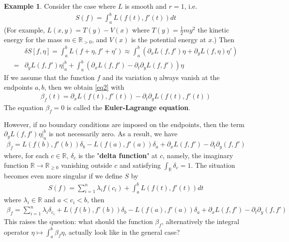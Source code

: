 \documentclass[12pt,b5paper,notitlepage]{article}
\theoremstyle{definition}
\newtheorem{eg}[df]{Example}
\theoremstyle{plain}
\newcommand{\Rbb}{\mathbb R}
\newcommand{\dps}{\displaystyle}
\numberwithin{equation}{section}
\begin{document}
\begin{eg}
Consider the case where $L$ is smooth and $r=1$, i.e.
\begin{align*}
S(f)=\int_a^b L(f(t),f'(t))dt
\end{align*}
(For example, $L(x,y)=T(y)-V(x)$ where $T(y)=\frac 12 my^2$ the kinetic energy for the mass $m\in\Rbb_{>0}$, and $V(x)$ is the potential energy at $x$.) Then
\begin{align*}
&\delta S[f,\eta]=\int_a^b L(f+\eta,f'+\eta')\approx \int_a^b (\partial_x L(f,f')\eta+\partial_y L(f,\eta)\eta')\\
=&\partial_yL(f,f')\eta\big|_a^b+\int_a^b (\partial_xL(f,f')-\partial_t\partial_yL(f,f'))\eta
\end{align*}
If we assume that the function $f$ and its variation $\eta$ always vanish at the endpoints $a,b$, then we obtain \eqref{eq2} with
\begin{align*}
\beta_f(t)=\partial_xL(f(t),f'(t))-\partial_t\partial_yL(f(t),f'(t))
\end{align*}
The equation $\beta_f=0$ is called the \textbf{Euler-Lagrange equation}. 

However, if no boundary conditions are imposed on the endpoints, then the term $\partial_yL(f,f')\eta\big|_a^b$ is not necessarily zero. As a result, we have
\begin{align*}
\beta_f=L(f(b),f'(b))\delta_b-L(f(a),f'(a))\delta_a+\partial_xL(f,f')-\partial_t\partial_y(f,f')
\end{align*}
where, for each $c\in\Rbb$, $\delta_c$ is the "\textbf{delta function}"  at $c$, namely, the imaginary function $\Rbb\rightarrow\Rbb_{\geq0}$ vanishing outside $c$ and satisfying $\int_\Rbb\delta_c=1$. The situation becomes even more singular if we define $S$ by
\begin{align*}
S(f)=\sum_{i=1}^n \lambda_i f(c_i)+\int_a^b L(f(t),f'(t))dt
\end{align*} 
where $\lambda_i\in\Rbb$ and $a<c_i<b$, then
\begin{align*}
\beta_f=\sum_{i=1}^n \lambda_i\delta_{c_i}+L(f(b),f'(b))\delta_b-L(f(a),f'(a))\delta_a+\partial_xL(f,f')-\partial_t\partial_y(f,f')
\end{align*}
This raises the question: what should the function $\beta_f$, alternatively the integral operator $\dps\eta\mapsto \int_a^b\beta_f\eta$, actually look like in the general case?  \hfill\qedsymbol
\end{eg}
\end{document}
